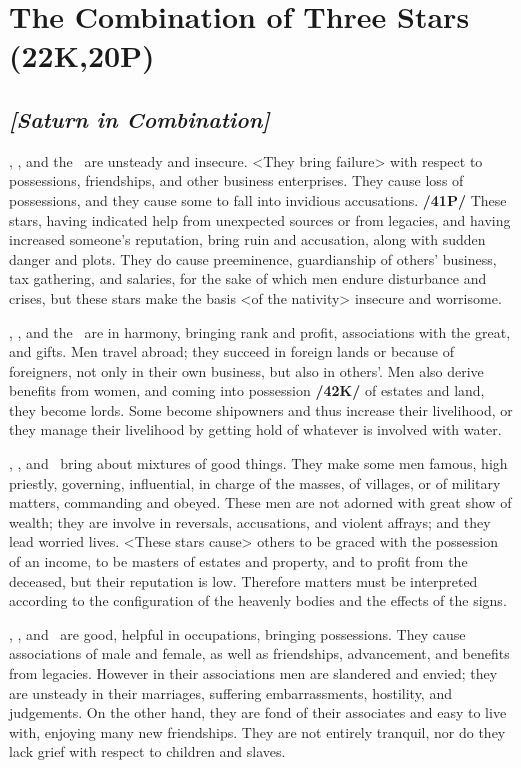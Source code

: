 \section{The Combination of Three Stars (22K,20P)}
\subsection{\textit{[Saturn in Combination]}}
\Saturn, \Jupiter, and the \Sun\, are unsteady and insecure. <They bring failure> with respect to possessions, friendships, and other business enterprises. They cause loss of possessions, and they cause some to fall into invidious accusations. \textbf{/41P/} These stars, having indicated help from unexpected sources or from legacies, and having increased someone’s reputation, bring ruin and accusation, along with sudden danger and plots. They do cause preeminence, guardianship of others’ business, tax gathering, and salaries, for the sake of which men endure disturbance and crises, but these stars make the basis <of the nativity> insecure and worrisome.

\Saturn, \Jupiter, and the \Moon\, are in harmony, bringing rank and profit, associations with the great, and gifts. Men travel abroad; they succeed in foreign lands or because of foreigners, not only in their own business, but also in others’. Men also derive benefits from women, and coming into possession \textbf{/42K/} of estates and land, they become lords. Some become shipowners and thus increase their livelihood, or they manage their livelihood by getting hold of whatever is involved with water.

\Saturn, \Jupiter, and \Mars\, bring about mixtures of good things. They make some men famous, high priestly,
governing, influential, in charge of the masses, of villages, or of military matters, commanding and obeyed. These men are not adorned with great show of wealth; they are involve in reversals, accusations, and violent affrays; and they lead worried lives. <These stars cause> others to be graced with the possession of an income, to be masters of estates and property, and to profit from the deceased, but their reputation is low. \mndl Therefore matters must be interpreted according to the configuration of the heavenly bodies and the effects of the signs.

\Saturn, \Jupiter, and \Venus\, are good, helpful in occupations, bringing possessions. They cause associations of male and female, as well as friendships, advancement, and benefits from legacies. However in their associations men are slandered and envied; they are unsteady in their marriages, suffering embarrassments, hostility, and judgements. On the other hand, they are fond of their associates and easy to
live with, enjoying many new friendships. They are not entirely tranquil, nor do they lack grief with respect to children and slaves.

